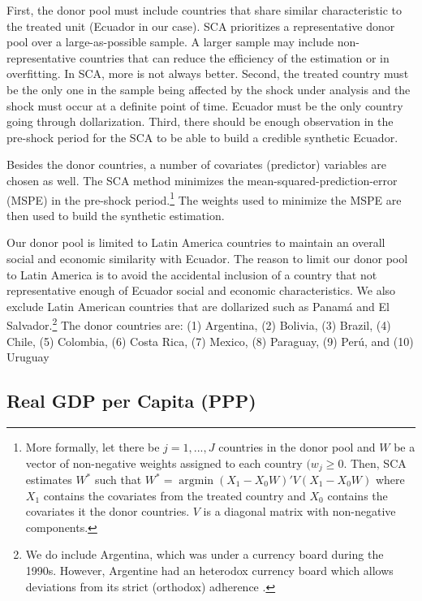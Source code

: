 \documentclass[12pt]{article}
\begin{document}
First, the donor pool must include countries that share similar characteristic to the treated unit (Ecuador in our case). SCA prioritizes a representative donor pool over a large-as-possible sample. A larger sample may include non-representative countries that can reduce the efficiency of the estimation or in overfitting. In SCA, more is not always better. Second, the treated country must be the only one in the sample being affected by the shock under analysis and the shock must occur at a definite point of time. Ecuador must be the only country going through dollarization. Third, there should be enough observation in the pre-shock period for the SCA to be able to build a credible synthetic Ecuador.

Besides the donor countries, a number of covariates (predictor) variables are chosen as well. The SCA method minimizes the mean-squared-prediction-error (MSPE) in the pre-shock period.\footnote{More formally, let there be $j = 1,...,J$ countries in the donor pool and $W$ be a vector of non-negative weights assigned to each country $(w_j \geq 0$. Then, SCA estimates $W^*$ such that $W^* = \operatorname{arg\min} (X_1 - X_0W)'V(X_1 - X_0W)$ where $X_1$ contains the covariates from the treated country and $X_0$ contains the covariates it the donor countries. $V$ is a diagonal matrix with non-negative components.} The weights used to minimize the MSPE are then used to build the synthetic estimation.

Our donor pool is limited to Latin America countries to maintain an overall social and economic similarity with Ecuador. The reason to limit our donor pool to Latin America is to avoid the accidental inclusion of a country that not representative enough of Ecuador social and economic characteristics. We also exclude Latin American countries that are dollarized such as Panamá and El Salvador.\footnote{We do include Argentina, which was under a currency board during the 1990s. However, Argentine had an heterodox currency board which allows deviations from its strict (orthodox) adherence \parencite{Hanke2008}.} The donor countries are: (1) Argentina, (2) Bolivia, (3) Brazil, (4) Chile, (5) Colombia, (6) Costa Rica, (7) Mexico, (8) Paraguay, (9) Perú, and (10) Uruguay



\subsection{Real GDP per Capita (PPP)}
\end{document}
